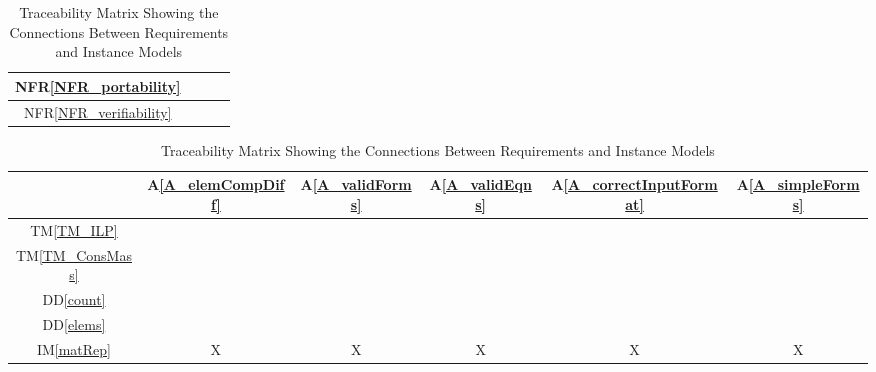 \documentclass[12pt]{article}
\newcommand{\ddref}[1]{DD\ref{#1}}
\newcommand{\tmref}[1]{TM\ref{#1}}
\newcommand{\aref}[1]{A\ref{#1}}
\newcommand{\imref}[1]{IM\ref{#1}}
\newcommand{\nfrref}[1]{NFR\ref{#1}}
\begin{document}
\begin{table}[h!]
{\begin{tabular}{|c|c|c|c|}
      \nfrref{NFR_portability}       &                &                 &                \\ \hline %
      \nfrref{NFR_verifiability}     &                &                 &                \\ \hline %
    \end{tabular}
    \caption{Traceability Matrix Showing the Connections Between Requirements and Instance Models}
    \label{Table:R_trace}
  }
  \hfill
  \parbox{.45\linewidth}{
    \centering
    \begin{tabular}{|c|c|c|c|c|c|}
      \hline
                                      & \aref{A_elemCompDiff} & \aref{A_validForms} & \aref{A_validEqns} & \aref{A_correctInputFormat} & \aref{A_simpleForms} \\
      \hline
      \tmref{TM_ILP}                  &                       &                     &                    &                             &                      \\ \hline
      \tmref{TM_ConsMass}             &                       &                     &                    &                             &                      \\ \hline
      \ddref{count}                   &                       &                     &                    &                             &                      \\ \hline
      \ddref{elems}                   &                       &                     &                    &                             &                      \\ \hline
      \imref{matRep}                  & X                     & X                   & X                  & X                           & X                    \\ \hline

\end{tabular}}
\end{table}
\end{document}
